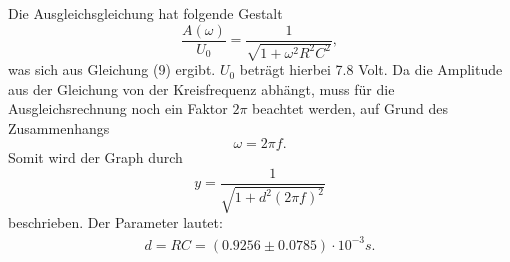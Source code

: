 \noindent Die Ausgleichsgleichung hat folgende Gestalt
\begin{equation*}
    \frac{A(\omega)}{U_0} = \frac{1}{ \sqrt{1+\omega^2R^2C^2}} ,
\end{equation*}
was sich aus Gleichung (9) ergibt. $U_0$ beträgt hierbei 7.8 Volt. Da die Amplitude aus der Gleichung von der Kreisfrequenz abhängt, 
muss für die Ausgleichsrechnung noch ein Faktor $2\pi$ beachtet werden, auf Grund des Zusammenhangs
\begin{equation}
    \omega = 2\pi f .
\end{equation}
Somit wird der Graph durch
\begin{equation}
    y = \frac{1}{ \sqrt{1+d^2(2\pi f)^2}} 
\end{equation}
beschrieben.
Der Parameter lautet:
\begin{align*}
   d = RC = (0.9256\pm  0.0785)\cdot 10^{-3} s .
\end{align*}


